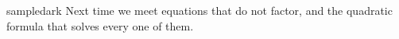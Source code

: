 \begin{blurbbox}{sampledark}
Next time we meet equations that do not factor, and the quadratic formula that solves every one of them.
\end{blurbbox}
